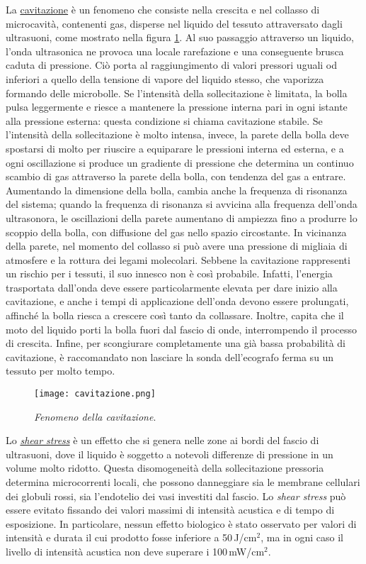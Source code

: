 \documentclass{report}
\newcommand{\figref}[1]{figura \ref{#1}}
\numberwithin{equation}{section}
\numberwithin{figure}{section}
\begin{document}
La \underline{cavitazione} è un fenomeno che consiste nella crescita e nel collasso di microcavità, contenenti gas, disperse nel liquido del tessuto attraversato dagli ultrasuoni, come mostrato nella \figref{fig:cavitazione}. Al suo passaggio attraverso un liquido, l'onda ultrasonica ne provoca una locale rarefazione e una conseguente brusca caduta di pressione. Ciò porta al raggiungimento di valori pressori uguali od inferiori a quello della tensione di vapore del liquido stesso, che vaporizza formando delle microbolle. Se l’intensità della sollecitazione è limitata, la bolla pulsa leggermente e riesce a mantenere la pressione interna pari in ogni istante alla pressione esterna: questa condizione si chiama cavitazione stabile. Se l’intensità della sollecitazione è molto intensa, invece, la parete della bolla deve spostarsi di molto per riuscire a equiparare le pressioni interna ed esterna, e a ogni oscillazione si produce un gradiente di pressione che determina un continuo scambio di gas attraverso la parete della bolla, con tendenza del gas a entrare. Aumentando la dimensione della bolla, cambia anche la frequenza di risonanza del sistema; quando la frequenza di risonanza si avvicina alla frequenza dell'onda ultrasonora, le oscillazioni della parete aumentano di ampiezza fino a produrre lo scoppio della bolla, con diffusione del gas nello spazio circostante. In vicinanza della parete, nel momento del collasso si può avere una pressione di migliaia di atmosfere e la rottura dei legami molecolari. Sebbene la cavitazione rappresenti un rischio per i tessuti, il suo innesco non è così probabile. Infatti, l'energia trasportata dall'onda deve essere particolarmente elevata per dare inizio alla cavitazione, e anche i tempi di applicazione dell'onda devono essere prolungati, affinché la bolla riesca a crescere così tanto da collassare. Inoltre, capita che il moto del liquido porti la bolla fuori dal fascio di onde, interrompendo il processo di crescita. Infine, per scongiurare completamente una già bassa probabilità di cavitazione, è raccomandato non lasciare la sonda dell'ecografo ferma su un tessuto per molto tempo.

\begin{figure}[htp]
\centering
\texttt{[image: cavitazione.png]}
\caption{\label{fig:cavitazione} \textit{Fenomeno della cavitazione}.}
\end{figure}

Lo \underline{\textit{shear stress}} è un effetto che si genera nelle zone ai bordi del fascio di ultrasuoni, dove il liquido è soggetto a notevoli differenze di pressione in un volume molto ridotto. Questa disomogeneità della sollecitazione pressoria determina microcorrenti locali, che possono danneggiare sia le membrane cellulari dei globuli rossi, sia l’endotelio dei vasi investiti dal fascio. Lo \textit{shear stress} può essere evitato fissando dei valori massimi di intensità acustica e di tempo di esposizione. In particolare, nessun effetto biologico è stato osservato per valori di intensità e durata il cui prodotto fosse inferiore a 50\,J/$\text{cm}^2$, ma in ogni caso il livello di intensità acustica non deve superare i 100\,mW/$\text{cm}^2$.
\end{document}
